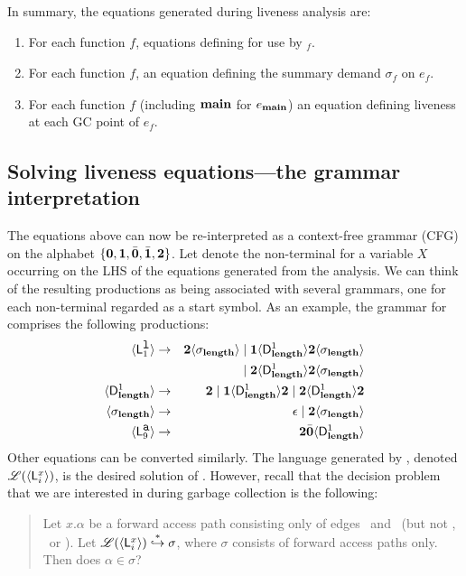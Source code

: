 \documentclass[preprint,9pt]{sigplanconf}
\begin{document}
In  summary, the  equations  generated during  liveness
analysis are:
\begin{enumerate}
\item   For  each   function  $\mathit{f}$,   equations
  defining  for use by \Lfonly$_{\mathit f}$.
\item For each function $\mathit{f}$, an equation defining the summary
  demand $\sigma_{\mathit f}$ on $e_f$.
\item   For  each   function  $\mathit{f}$   (including
  $\mathbf{main}$  for  $e_{\mathbf{main}}$) an  equation  defining
  liveness at each GC point of $e_{\mathit f}$.
\end{enumerate}
\subsection{Solving liveness equations---the grammar
interpretation}\label{sec:grammar-formulation}      The
equations  above   can  now  be  re-interpreted   as  a
context-free    grammar   (CFG)    on   the    alphabet
$\lbrace\mathbf{0},  \mathbf{1},  \bar{\mathbf{0}},  \bar{\mathbf{1}},  {\mathbf{2}}\rbrace$.
Let   denote the  non-terminal for  a variable
$X$  occurring on  the LHS  of the  equations generated
from  the  analysis.  We  can  think  of the  resulting
productions as being  associated with several grammars,
one for each non-terminal  regarded as
a  start  symbol.   As  an  example,  the  grammar  for
     comprises     the     following
productions:
\begin{eqnarray*}
  \langle \mathsf{L}_{{1}}^{\mbox{\tt l}}\rangle  &\rightarrow& 
  {\mathbf{2}}\langle \sigma_{\mathbf{length}}\rangle \mid \mathbf{1} \langle \mathsf{D}_{\mathit {\mathbf{length}}}^{1}\rangle{\ensuremath{{\mathbf{2}}}\ensuremath{\langle \sigma_{\mathbf{length}}\rangle}}  \\
  & & \mid
  {\mathbf{2}}\langle \mathsf{D}_{\mathit {\mathbf{length}}}^{1}\rangle{\ensuremath{{\mathbf{2}}}\ensuremath{\langle \sigma_{\mathbf{length}}\rangle}} \\
  \langle \mathsf{D}_{\mathit {\mathbf{length}}}^{1}\rangle &\rightarrow& {\mathbf{2}} \mid
  \mathbf{1}\langle \mathsf{D}_{\mathit {\mathbf{length}}}^{1}\rangle{\mathbf{2}}
       \mid {\mathbf{2}}\langle \mathsf{D}_{\mathit {\mathbf{length}}}^{1}\rangle{\ensuremath{{\mathbf{2}}}}\\
\langle {\sigma_{\ensuremath{\mathbf{length}}}} \rangle
&\rightarrow&
\epsilon  \mid {\mathbf{2}}\langle{\sigma_{\ensuremath{\mathbf{length}}}}\rangle \\
\langle \mathsf{L}_{{9}}^{\mbox{\tt a}}\rangle &\rightarrow& {\mathbf{2}} \bar{\mathbf{0}} \langle \mathsf{D}_{\mathit {\mathbf{length}}}^{1}\rangle
\end{eqnarray*}
Other  equations  can   be  converted  similarly.   The
language   generated   by  ,   denoted
$\mathscr{L}(\langle \mathsf{L}_{{i}}^{x}\rangle)$,   is    the   desired
solution  of  .    
However, recall that the decision problem that we are interested in
during garbage collection is the following: 
\begin{quote}
Let $x.\alpha$ be a forward access path consisting only
of edges  \acar\ and \acdr\  (but not \bcar,  \bcdr\ or
\clazy).       Let      $\mathscr{L}(\langle \mathsf{L}_{{i}}^{x}\rangle)
\stackrel{*}{\hookrightarrow}  \sigma$, where  $\sigma$
consists  of  forward  access  paths  only.  Then  does
$\alpha \in \sigma$?
\end{quote}
\end{document}
